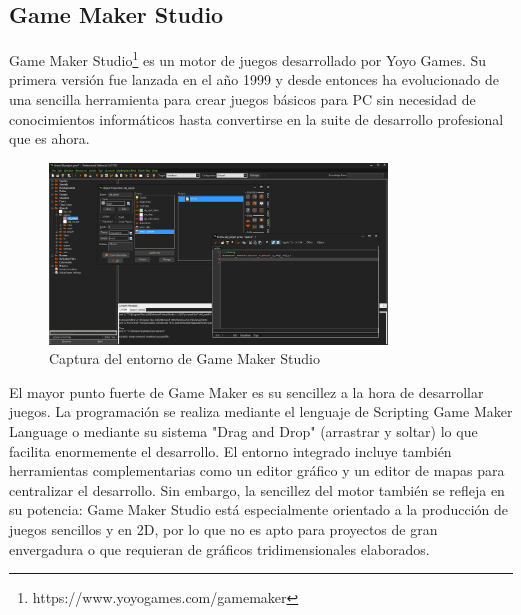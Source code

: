 \subsection{Game Maker Studio}
Game Maker Studio\footnote{https://www.yoyogames.com/gamemaker} es un motor de juegos desarrollado por Yoyo Games. Su primera versión fue lanzada en el año 1999 y desde entonces ha evolucionado de una sencilla herramienta para crear juegos básicos para PC sin necesidad de conocimientos informáticos hasta convertirse en la suite de desarrollo profesional que es ahora.
\begin{figure}[h]
	\includegraphics[width=0.8\textwidth]{images/estadodelarte/motores/captura-game-maker}
	\centering
	\caption{Captura del entorno de Game Maker Studio}
\end{figure}

El mayor punto fuerte de Game Maker es su sencillez a la hora de desarrollar juegos. La programación se realiza mediante el lenguaje de Scripting Game Maker Language o mediante su sistema "Drag and Drop" (arrastrar y soltar) lo que facilita enormemente el desarrollo. El entorno integrado incluye también herramientas complementarias como un editor gráfico y un editor de mapas para centralizar el desarrollo. Sin embargo, la sencillez del motor también se refleja en su potencia: Game Maker Studio está especialmente orientado a la producción de juegos sencillos y en 2D, por lo que no es apto para proyectos de gran envergadura o que requieran de gráficos tridimensionales elaborados.

